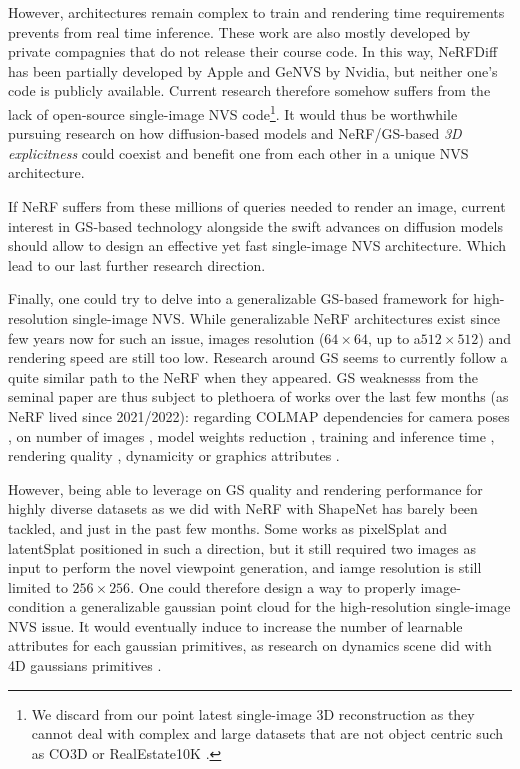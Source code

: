 However, architectures remain complex to train and rendering time requirements prevents from real time inference. These work are also mostly developed by private compagnies that do not release their course code. In this way, NeRFDiff has been partially developed by Apple and GeNVS by Nvidia, but neither one's code is publicly available. Current research therefore somehow suffers from the lack of open-source single-image \ac{NVS} code\footnote{We discard from our point latest single-image 3D reconstruction as they cannot deal with complex and large datasets that are not object centric such as CO3D \citep{reizenstein2021common}or RealEstate10K \citep{zhou2018stereo}.}. It would thus be worthwhile pursuing research on how diffusion-based models and \ac{NeRF}/\ac{GS}-based \textit{3D explicitness} could coexist and benefit one from each other in a unique \ac{NVS} architecture.

If \ac{NeRF} suffers from these millions of queries needed to render an image, current interest in \ac{GS}-based technology alongside the swift advances on diffusion models should allow to design an effective yet fast single-image \ac{NVS} architecture. Which lead to our last further research direction. 

Finally, one could try to delve into a generalizable \ac{GS}-based framework for high-resolution single-image \ac{NVS}. While generalizable \ac{NeRF} architectures exist since few years now \citep{yu2021pixelnerf,li2022symmnerf,lin2023vision} for such an issue, images resolution ($64\times 64$, up to a$512\times 512$) and rendering speed are still too low. Research around \ac{GS} seems to currently follow a quite similar path to the \ac{NeRF} when they appeared. \ac{GS} weaknesss from the seminal paper \citep{kerbl20233d} are thus subject to plethoera of works over the last few months (as \ac{NeRF} lived since 2021/2022): regarding COLMAP dependencies for camera poses \citep{fu2023colmapfree}, on number of images \citep{xiong2023sparsegs,yang2024gaussianobject}, model weights reduction \citep{niedermayr2023compressed}, training and inference time \citep{fan2024instantsplat}, rendering quality \citep{yu2023mip} , dynamicity \citep{luiten2023dynamic} or graphics attributes \citep{wu2024deferredgs}.  

However, being able to leverage on \ac{GS} quality and rendering performance for highly diverse datasets as we did with NeRF \citep{landreau2024epinerf} with ShapeNet \citep{chang2015shapenet} has barely been tackled, and just in the past few months. Some works as pixelSplat and latentSplat positioned in such a direction, but it still required two images as input to perform the novel viewpoint generation, and iamge resolution is still limited to $256\times 256$. One could therefore design a way to properly image-condition a generalizable gaussian point cloud for the high-resolution single-image \ac{NVS} issue. It would eventually induce to increase the number of learnable attributes for each gaussian primitives, as research on dynamics scene did with 4D gaussians primitives \citep{luiten2023dynamic,gao2024gaussianflow}.  


